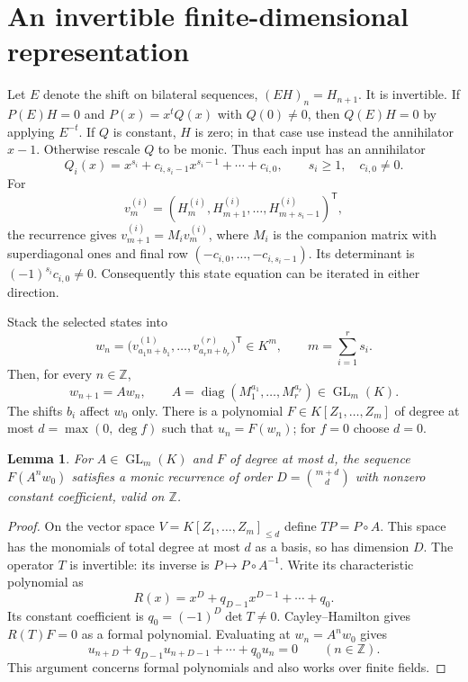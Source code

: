 \documentclass[11pt]{article}
\newtheorem{lemma}{Lemma}
\begin{document}
\section*{An invertible finite-dimensional representation}
Let $E$ denote the shift on bilateral sequences, $(EH)_n=H_{n+1}$.
It is invertible. If $P(E)H=0$ and $P(x)=x^tQ(x)$ with $Q(0)\ne0$,
then $Q(E)H=0$ by applying $E^{-t}$. If $Q$ is constant, $H$ is zero;
in that case use instead the annihilator $x-1$. Otherwise rescale $Q$
to be monic. Thus each input has an annihilator
\[
 Q_i(x)=x^{s_i}+c_{i,s_i-1}x^{s_i-1}+\cdots+c_{i,0},
 \qquad s_i\geq1,\quad c_{i,0}\ne0.
\]
For
\[
 v^{(i)}_m=(H^{(i)}_m,H^{(i)}_{m+1},\ldots,
 H^{(i)}_{m+s_i-1})^{\mathsf T},
\]
the recurrence gives $v^{(i)}_{m+1}=M_i v^{(i)}_m$, where $M_i$
is the companion matrix with superdiagonal ones and final row
$(-c_{i,0},\ldots,-c_{i,s_i-1})$.
Its determinant is $(-1)^{s_i}c_{i,0}\ne0$.
Consequently this state equation can be iterated in either direction.

Stack the selected states into
\[
 w_n=\bigl(v^{(1)}_{a_1n+b_1},\ldots,v^{(r)}_{a_rn+b_r}\bigr)^{\mathsf T}
 \in K^m,\qquad m=\sum_{i=1}^r s_i.
\]
Then, for every $n\in\mathbb Z$,
\[
 w_{n+1}=Aw_n,\qquad A=\operatorname{diag}(M_1^{a_1},\ldots,M_r^{a_r})
 \in\operatorname{GL}_m(K).
\]
The shifts $b_i$ affect $w_0$ only. There is a polynomial
$F\in K[Z_1,\ldots,Z_m]$ of degree at most $d=\max(0,\deg f)$
such that $u_n=F(w_n)$; for $f=0$ choose $d=0$.

\begin{lemma}\label{lift}
For $A\in\operatorname{GL}_m(K)$ and $F$ of degree at most $d$,
the sequence $F(A^nw_0)$ satisfies a monic recurrence of order
$D=\binom{m+d}{d}$ with nonzero constant coefficient, valid on $\mathbb Z$.
\end{lemma}
\begin{proof}
On the vector space $V=K[Z_1,\ldots,Z_m]_{\leq d}$ define
$TP=P\circ A$. This space has the monomials of total degree at most
$d$ as a basis, so has dimension $D$. The operator $T$ is invertible:
its inverse is $P\mapsto P\circ A^{-1}$.
Write its characteristic polynomial as
\[
 R(x)=x^D+q_{D-1}x^{D-1}+\cdots+q_0.
\]
Its constant coefficient is $q_0=(-1)^D\det T\ne0$.
Cayley--Hamilton gives $R(T)F=0$ as a formal polynomial. Evaluating
at $w_n=A^nw_0$ gives
\begin{equation}\label{rec}
 u_{n+D}+q_{D-1}u_{n+D-1}+\cdots+q_0u_n=0
 \qquad(n\in\mathbb Z).
\end{equation}
This argument concerns formal polynomials and also works over finite fields.
\end{proof}
\end{document}
